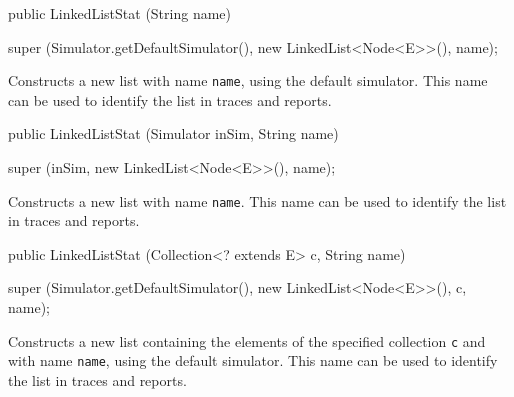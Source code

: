 \begin{htmlonly}
\end{htmlonly}
\begin{code}

   public LinkedListStat (String name)\begin{hide} {
      super (Simulator.getDefaultSimulator(), new LinkedList<Node<E>>(), name);
   }\end{hide}
\end{code}
\begin{tabb} Constructs a new list with name \texttt{name}, using the default simulator.
   This name can be used to identify the list in traces and reports.
\end{tabb}
\begin{htmlonly}
\end{htmlonly}
\begin{code}

   public LinkedListStat (Simulator inSim, String name)\begin{hide} {
      super (inSim, new LinkedList<Node<E>>(), name);
   }\end{hide}
\end{code}
\begin{tabb} Constructs a new list with name \texttt{name}.
   This name can be used to identify the list in traces and reports.
\end{tabb}
\begin{htmlonly}
\end{htmlonly}
\begin{code}

   public LinkedListStat (Collection<? extends E> c, String name)\begin{hide} {
      super (Simulator.getDefaultSimulator(), new LinkedList<Node<E>>(), c, name);
   }\end{hide}
\end{code}
\begin{tabb} Constructs a new list containing the elements of the
   specified collection \texttt{c} and with name \texttt{name}, using the default simulator.
   This name can be used to identify the list in traces and reports.
\end{tabb}
\begin{htmlonly}\
   \param{name}{name for the list object}
\end{htmlonly}
